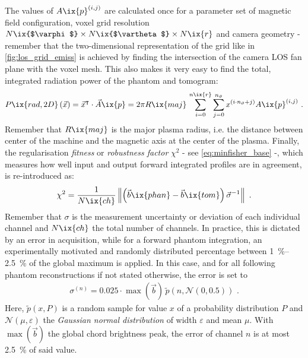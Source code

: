 %
        The values of $A\ix{p}^{\left(i,j\right)}$ are calculated once for a parameter set of magnetic field configuration, voxel grid resolution $N\ix{$\varphi$}\times N\ix{$\vartheta$}\times N\ix{r}$ and camera geometry - remember that the two-dimensional representation of the grid like in \cref{fig:los_grid_emiss} is achieved by finding the intersection of the camera LOS fan plane with the voxel mesh. This also makes it very easy to find the total, integrated radiation power of the phantom and tomogram:
%
        \begin{align}%
            P\ix{rad,2D}\left(\vec{x}\right)=\vec{x}^{\intercal}\cdot\vec{A}\ix{p}=%
            2\pi R\ix{maj}\,\displaystyle\sum_{i=0}^{n\ix{r}}\sum_{j=0}^{n_{\vartheta}}x^{\left(i\cdot n_{\vartheta}+j\right)}A\ix{p}^{\left(i,j\right)}\,\,.%
            \label{eq:prad2D}%
        \end{align}%
%
        Remember that $R\ix{maj}$ is the major plasma radius, i.e. the distance between center of the machine and the magnetic axis at the center of the plasma. Finally, the regularisation \textit{fitness} or \textit{robustness factor} $\chi^{2}$ - see \cref{eq:minfisher_base} -, which measures how well input and output forward integrated profiles are in agreement, is re-introduced as:%
%
        \begin{align}%
            \chi^{2}=\frac{1}{N\ix{ch}}\left\|\left(\vec{b}\ix{phan}-\vec{b}\ix{tom}\right)\vec{\sigma}^{-1}\right\|\,\,.\label{eq:chi2}%
        \end{align}%
%
        Remember that $\sigma$ is the measurement uncertainty or deviation of each individual channel and $N\ix{ch}$ the total number of channels. In practice, this is dictated by an error in acquisition, while for a forward phantom integration, an experimentally motivated and randomly distributed percentage between \SIrange{1}{2.5}{\percent} of the global maximum is applied. In this case, and for all following phantom reconstructions if not stated otherwise, the error is set to%
%
        \begin{align}%
            \sigma^{\left(n\right)}=0.025\cdot\max\left(\vec{b}\right)\,\widetilde{p}\left(n,\mathcal{N}\left(0,0.5\right)\right)\,\,.\nonumber%
        \end{align}%
%
        Here, $\widetilde{p}\left(x,P\right)$ is a random sample for value $x$ of a probability distribution $P$ and $\mathcal{N}\left(\mu,\varepsilon\right)$ the \textit{Gaussian normal distribution} of width $\varepsilon$ and mean $\mu$. With $\max\left(\vec{b}\right)$ the global chord brightness peak, the error of channel $n$ is at most \SI{2.5}{\percent} of said value.\\%
